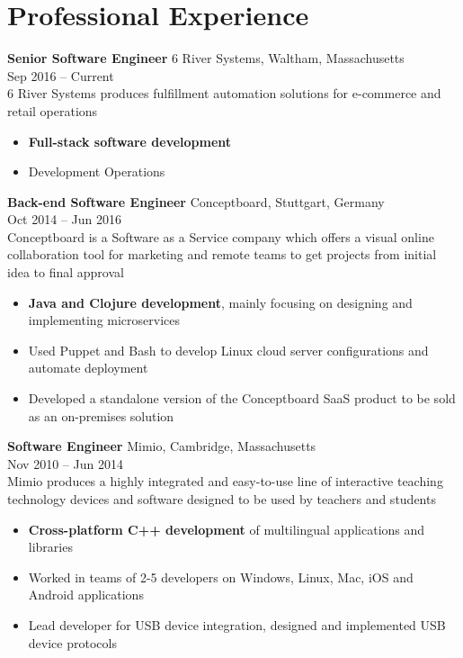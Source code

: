\documentclass{article}
\begin{document}
\section*{Professional Experience}
{\bf Senior Software Engineer} 6 River Systems, Waltham, Massachusetts\\
Sep 2016 -- Current\\
6 River Systems produces fulfillment automation solutions for e-commerce and retail operations
\begin{itemize}
  \itemsep0em
  \item {\bf Full-stack software development}
  \item Development Operations
\end{itemize}
{\bf Back-end Software Engineer} Conceptboard, Stuttgart, Germany\\
Oct 2014 -- Jun 2016\\
Conceptboard is a Software as a Service company which offers a visual online collaboration tool for marketing and remote teams to get projects from initial idea to final approval
\begin{itemize}
  \itemsep0em
  \item {\bf Java and Clojure development}, mainly focusing on designing and implementing microservices
  \item Used Puppet and Bash to develop Linux cloud server configurations and automate deployment
  \item Developed a standalone version of the Conceptboard SaaS product to be sold as an on-premises solution
\end{itemize}
{\bf Software Engineer} Mimio, Cambridge, Massachusetts\\
Nov 2010 -- Jun 2014\\
Mimio produces a highly integrated and easy-to-use line of interactive teaching technology devices and software designed to be used by teachers and students
\begin{itemize}
  \itemsep0em
  \item {\bf Cross-platform C++ development} of multilingual applications and libraries
  \item Worked in teams of 2-5 developers on Windows, Linux, Mac, iOS and Android applications
  \item Lead developer for USB device integration, designed and implemented USB device protocols
\end{itemize}
\end{document}
